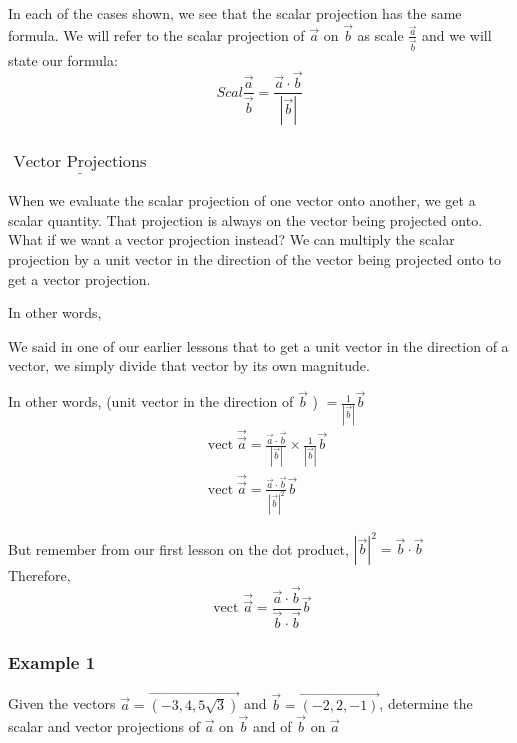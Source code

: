 \documentclass{article}
\begin{document}
\begin{tcolorbox}[enhanced,frame style image=blueshade.png,
  opacityback=0.75,opacitybacktitle=0.25,
  colback=blue!5!white,colframe=blue!75!black] 
In each of the cases shown, we see that the scalar projection has the same formula. We will refer to the scalar projection of $\vec{a}$ on $\vec{b}$ as scale $\frac{\vec{a}}{\vec{b}}$ and we will state our formula:
$$Scal\frac{\vec{a}}{\vec{b}}=\frac{\vec{a}\cdot \vec{b}}{|\vec{b}|}$$

\end{tcolorbox}


\subsubsection{$\underline{\text { Vector Projections }}$}

When we evaluate the scalar projection of one vector onto another, we get a scalar quantity.
That projection is always on the vector being projected onto.
What if we want a vector projection instead?
We can multiply the scalar projection by a unit vector in the direction of the vector being projected onto to get a vector projection.

In other words,

We said in one of our earlier lessons that to get a unit vector in the direction of a vector, we simply divide that vector by its own magnitude.

In other words, (unit vector in the direction of $\vec{b}$ ) $=\frac{1}{|\vec{b}|} \vec{b}$
$$
\begin{aligned}
& \operatorname{vect} \overrightarrow{\vec{a}}=\frac{\vec{a} \cdot \vec{b}}{|\vec{b}|} \times \frac{1}{|\vec{b}|} \vec{b} \\
& \operatorname{vect} \overrightarrow{\vec{a}}=\frac{\vec{a} \cdot \vec{b}}{|\vec{b}|^2} \vec{b}
\end{aligned}
$$

But remember from our first lesson on the dot product, $|\vec{b}|^2=\vec{b} \cdot \vec{b}$\\
Therefore,
$$
\text { vect } \overrightarrow{\vec{a}}=\frac{\vec{a} \cdot \vec{b}}{\vec{b} \cdot \vec{b}} \vec{b}
$$

\subsubsection*{Example 1}
Given the vectors $\vec{a}=\overrightarrow{(-3,4,5 \sqrt{3})}$ and $\vec{b}=\overrightarrow{(-2,2,-1)}$, determine the scalar and vector projections of $\vec{a}$ on $\vec{b}$ and of $\vec{b}$ on $\vec{a}$
\end{document}
